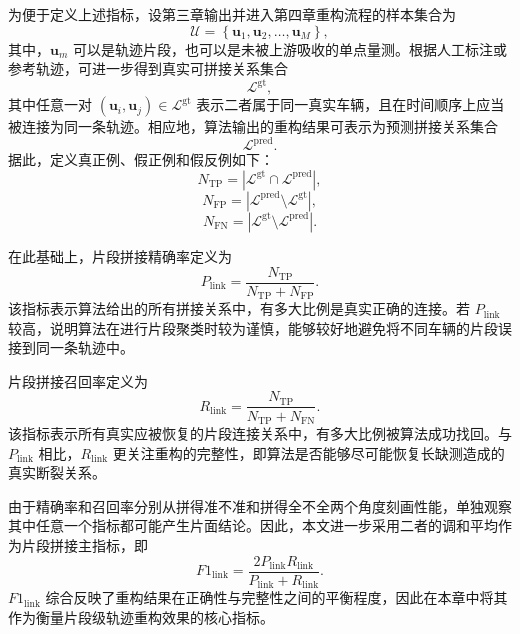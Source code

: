 \documentclass{xdupgthesis}
\begin{document}
为便于定义上述指标，设第三章输出并进入第四章重构流程的样本集合为
\begin{equation}
	\mathcal{U}=\left\{\mathbf{u}_1,\mathbf{u}_2,\ldots,\mathbf{u}_M\right\},
\end{equation}
其中，$\mathbf{u}_m$ 可以是轨迹片段，也可以是未被上游吸收的单点量测。根据人工标注或参考轨迹，可进一步得到真实可拼接关系集合
\begin{equation}
	\mathcal{L}^{\mathrm{gt}},
\end{equation}
其中任意一对 $\left(\mathbf{u}_i,\mathbf{u}_j\right)\in\mathcal{L}^{\mathrm{gt}}$ 表示二者属于同一真实车辆，且在时间顺序上应当被连接为同一条轨迹。相应地，算法输出的重构结果可表示为预测拼接关系集合
\begin{equation}
	\mathcal{L}^{\mathrm{pred}}.
\end{equation}
据此，定义真正例、假正例和假反例如下：
\begin{equation}
	N_{\mathrm{TP}}=\left|\mathcal{L}^{\mathrm{gt}}\cap\mathcal{L}^{\mathrm{pred}}\right|,
\end{equation}
\begin{equation}
	N_{\mathrm{FP}}=\left|\mathcal{L}^{\mathrm{pred}}\setminus\mathcal{L}^{\mathrm{gt}}\right|,
\end{equation}
\begin{equation}
	N_{\mathrm{FN}}=\left|\mathcal{L}^{\mathrm{gt}}\setminus\mathcal{L}^{\mathrm{pred}}\right|.
\end{equation}

在此基础上，片段拼接精确率定义为
\begin{equation}
	P_{\mathrm{link}}
	=
	\frac{N_{\mathrm{TP}}}{N_{\mathrm{TP}}+N_{\mathrm{FP}}}.
\end{equation}
该指标表示算法给出的所有拼接关系中，有多大比例是真实正确的连接。若 $P_{\mathrm{link}}$ 较高，说明算法在进行片段聚类时较为谨慎，能够较好地避免将不同车辆的片段误接到同一条轨迹中。

片段拼接召回率定义为
\begin{equation}
	R_{\mathrm{link}}
	=
	\frac{N_{\mathrm{TP}}}{N_{\mathrm{TP}}+N_{\mathrm{FN}}}.
\end{equation}
该指标表示所有真实应被恢复的片段连接关系中，有多大比例被算法成功找回。与 $P_{\mathrm{link}}$ 相比，$R_{\mathrm{link}}$ 更关注重构的完整性，即算法是否能够尽可能恢复长缺测造成的真实断裂关系。

由于精确率和召回率分别从拼得准不准和拼得全不全两个角度刻画性能，单独观察其中任意一个指标都可能产生片面结论。因此，本文进一步采用二者的调和平均作为片段拼接主指标，即
\begin{equation}
	F1_{\mathrm{link}}
	=
	\frac{2P_{\mathrm{link}}R_{\mathrm{link}}}{P_{\mathrm{link}}+R_{\mathrm{link}}}.
\end{equation}
$F1_{\mathrm{link}}$ 综合反映了重构结果在正确性与完整性之间的平衡程度，因此在本章中将其作为衡量片段级轨迹重构效果的核心指标。
\end{document}
